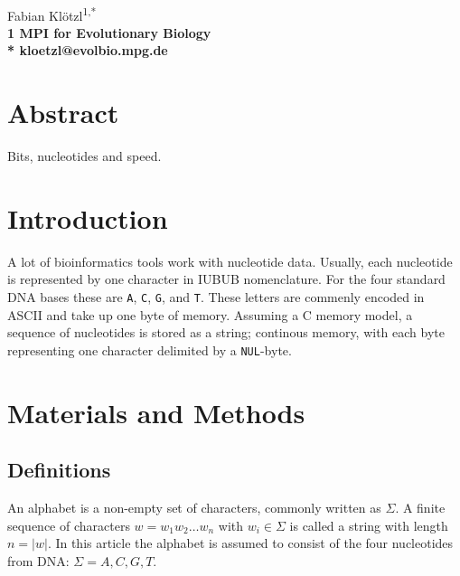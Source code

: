 \documentclass[10pt,letterpaper]{article}
\begin{document}
\vspace*{0.35in}

\begin{flushleft}
{\Large
\textbf{}
}
\newline
\\
Fabian Klötzl\textsuperscript{1,*}
\\
\bigskip
\bf{1} MPI for Evolutionary Biology
\\
\bigskip
* kloetzl@evolbio.mpg.de

\end{flushleft}

\section*{Abstract}
Bits, nucleotides and speed.

\linenumbers

\section*{Introduction}
A lot of bioinformatics tools work with nucleotide data. Usually, each nucleotide is represented by one character in IUBUB nomenclature. For the four standard DNA bases these are \lstinline!A!, \lstinline!C!, \lstinline!G!, and \lstinline!T!. These letters are commenly encoded in ASCII and take up one byte of memory. Assuming a C memory model, a sequence of nucleotides is stored as a string; continous memory, with each byte representing one character delimited by a \lstinline!NUL!-byte.

\section*{Materials and Methods}

\subsection*{Definitions}

An alphabet is a non-empty set of characters, commonly written as $\Sigma$. A finite sequence of characters $w = w_1 w_2 \ldots w_n$ with $w_i \in \Sigma$ is called a string with length $n = |w|$. In this article the alphabet is assumed to consist of the four nucleotides from DNA: $\Sigma = {A,C,G,T}$.
\end{document}
